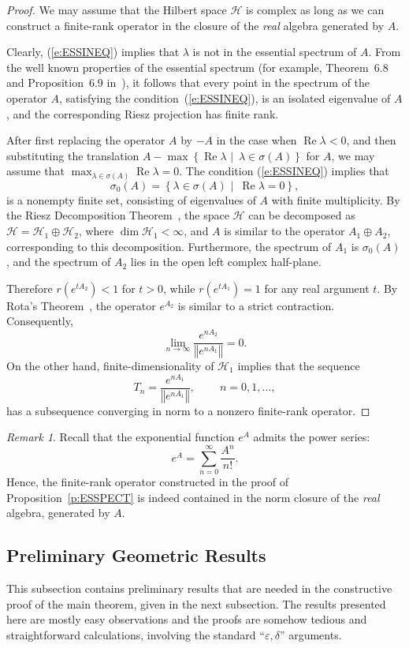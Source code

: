 \documentclass{tran-l}
\theoremstyle{definition}
\theoremstyle{remark}
\newtheorem{rem}[thm]{Remark}
\numberwithin{equation}{subsection}
\DeclareMathOperator{\RE}{Re}
\newcommand{\eps}{\varepsilon}
\newcommand{\To}{\longrightarrow}
\newcommand{\h}{\mathcal{H}}
\newcommand{\set}[1]{\left\{#1\right\}}
\newcommand{\norm}[1]{\left\Vert#1\right\Vert}
\begin{document}
\begin{proof}
We may assume that the Hilbert space $\h$ is complex as long as we can construct a finite-rank operator in the closure of the \emph{real} algebra generated by $A$.

Clearly, (\ref{e:ESSINEQ}) implies that $\lambda$ is not in the essential spectrum of $A$. From the well known properties of the essential spectrum (for example, Theorem~6.8 and Proposition~6.9 in~\cite[p.~366]{Con90}), it follows that every point in the spectrum of the operator $A$, satisfying the condition~(\ref{e:ESSINEQ}), is an isolated eigenvalue of $A$, and the corresponding Riesz projection has finite rank.

After first replacing the operator $A$ by $-A$ in the case when $\RE\lambda<0$, and then substituting the translation $A-\max\set{\RE\lambda\,\,|\,\,\,\lambda\in\sigma(A)}$ for $A$, we may assume that $\max_{\lambda\in\sigma(A)}{\RE\lambda}=0$. The condition (\ref{e:ESSINEQ}) implies that
\[ \sigma_0(A)=\set{\lambda\in\sigma(A)\,\,|\,\,\,\RE\lambda=0}, \]
is a nonempty finite set, consisting of eigenvalues of $A$ with finite multiplicity. By the Riesz Decomposition Theorem~\cite[p.~31]{RR73}, the space $\h$ can be decomposed as $\h=\h_1\oplus\h_2$, where $\dim{\h_1}<\infty$, and $A$ is similar to the operator $A_1\oplus{A_2}$, corresponding to this decomposition. Furthermore, the spectrum of $A_1$ is $\sigma_0(A)$, and the spectrum of $A_2$ lies in the open left complex half-plane.

Therefore $r(e^{t{A_2}})<1$ for $t>0$, while $r(e^{t{A_1}})=1$ for any real argument $t$. By Rota's Theorem~\cite[p.~136]{Pau86}, the operator $e^{A_2}$ is similar to a strict contraction. Consequently,
\[ \lim_{n\To\infty}\frac{ e^{n{A_2}} }{ \norm{e^{n{A_1}}} }=0. \]
On the other hand, finite-dimensionality of $\h_1$ implies that the sequence
\[ T_n = \frac{e^{n{A_1}}}{\norm{e^{n{A_1}}}}, ~ \qquad n=0,1,\ldots, \]
has a subsequence converging in norm to a nonzero finite-rank operator.
\end{proof}

\begin{rem}
Recall that the exponential function $e^A$ admits the power series:
\[ e^A = \sum_{n=0}^{\infty} \frac{A^n}{n!}. \]
Hence, the finite-rank operator constructed in the proof of Proposition~\ref{p:ESSPECT} is indeed contained in the norm closure of the \emph{real} algebra, generated by $A$.
\end{rem}

\subsection{Preliminary Geometric Results}
This subsection contains preliminary results that are needed in the constructive proof of the main theorem, given in the next subsection. The results presented here are mostly easy observations and the proofs are somehow tedious and straightforward calculations, involving the standard ``$\eps,\delta$'' arguments.
\end{document}
